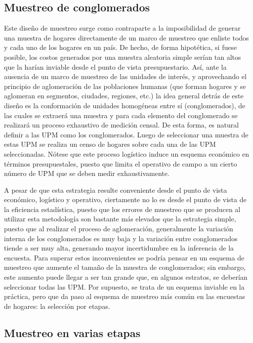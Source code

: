 \hypertarget{muestreo-de-conglomerados}{%
\subsection*{Muestreo de conglomerados}\label{muestreo-de-conglomerados}}


Este diseño de muestreo surge como contraparte a la imposibilidad de generar una muestra de hogares directamente de un marco de muestreo que enliste todos y cada uno de los hogares en un país. De hecho, de forma hipotética, si fuese posible, los costos generados por una muestra aleatoria simple serían tan altos que la harían inviable desde el punto de vista presupuestario. Así, ante la ausencia de un marco de muestreo de las unidades de interés, y aprovechando el principio de aglomeración de las poblaciones humanas (que forman hogares y se aglomeran en segmentos, ciudades, regiones, etc.) la idea general detrás de este diseño es la conformación de unidades homogéneas entre sí (conglomerados), de las cuales se extraerá una muestra y para cada elemento del conglomerado se realizará un proceso exhaustivo de medición censal. De esta forma, es natural definir a las UPM como los conglomerados. Luego de seleccionar una muestra de estas UPM se realiza un censo de hogares sobre cada una de las UPM seleccionadas. Nótese que este proceso logístico induce un esquema económico en términos presupuestales, puesto que limita el operativo de campo a un cierto número de UPM que se deben medir exhaustivamente.

A pesar de que esta estrategia resulte conveniente desde el punto de vista económico, logístico y operativo, ciertamente no lo es desde el punto de vista de la eficiencia estadística, puesto que los errores de muestreo que se producen al utilizar esta metodología son bastante más elevados que la estrategia simple, puesto que al realizar el proceso de aglomeración, generalmente la variación interna de los conglomerados es muy baja y la variación entre conglomerados tiende a ser muy alta, generando mayor incertidumbre en la inferencia de la encuesta. Para superar estos inconvenientes se podría pensar en un esquema de muestreo que aumente el tamaño de la muestra de conglomerados; sin embargo, este aumento puede llegar a ser tan grande que, en algunos estratos, se deberían seleccionar todas las UPM. Por supuesto, se trata de un esquema inviable en la práctica, pero que da paso al esquema de muestreo más común en las encuestas de hogares: la selección por etapas.

\hypertarget{muestreo-en-varias-etapas}{%
\subsection*{Muestreo en varias etapas}\label{muestreo-en-varias-etapas}}


